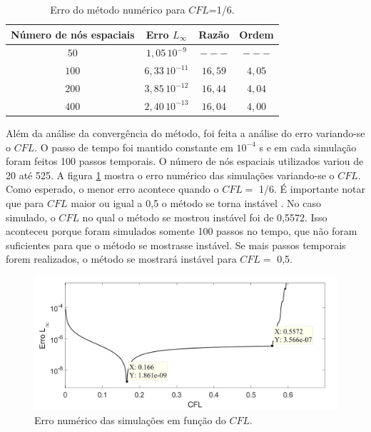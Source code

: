 \documentclass[10pt,twoside,a4paper]{article}
\begin{document}
\begin{table}[h!]
\caption{Erro do método numérico para $CFL$=1/6.}
\label{tabela2}
\centering
\begin{tabular}{cccc}
	\hline
	Número de nós espaciais &        Erro $L_\infty$       & Razão      & Ordem    \\ \hline
	$50$ &       $1,05 \, 10^{-9}$        & $---$      & $---$    \\ 
	$100$ &       $6,33 \, 10^{-11}$        & $16,59$      & $4,05$    \\ 
	$200$ &       $3,85 \, 10^{-12}$   & $16,44$      & $4,04$    \\ 
	$400$ &       $2,40 \, 10^{-13}$        & $16,04$      & $4,00$    \\ \hline
\end{tabular}
\end{table}

Além da análise da convergência do método, foi feita a análise do erro variando-se o $CFL$. O passo de tempo foi mantido constante em $10^{-4}$ s e em cada simulação foram feitos 100 passos temporais. O número de nós espaciais utilizados variou de 20 até 525. A figura \ref{fig:erro} mostra o erro numérico das simulações variando-se o $CFL$. Como esperado, o menor erro acontece quando o $CFL=$ 1/6. É importante notar que para $CFL$ maior ou igual a 0,5 o método se torna instável \cite{Leveque_parabolic}. No caso simulado, o $CFL$ no qual o método se mostrou instável foi de 0,5572. Isso aconteceu porque foram simulados somente 100 passos no tempo, que não foram suficientes para que o método se mostrasse instável. Se mais passos temporais forem realizados, o método se mostrará instável para $CFL=$ 0,5.

\begin{figure}[!hbt]
\centering
\includegraphics[scale=0.4]{semat_fig2}
\caption{Erro numérico das simulações em função do $CFL$.}
\label{fig:erro}
\end{figure}
\end{document}
